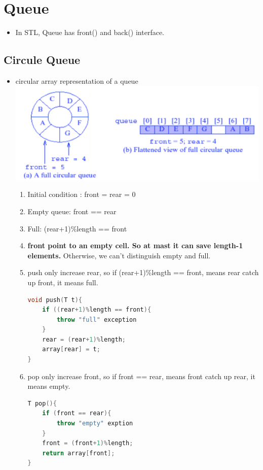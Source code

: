 \documentclass[a4paper,11pt,twoside]{book}
\begin{document}
\section{Queue}
\begin{itemize}
\item In STL, Queue has front() and back() interface. 

\end{itemize}


\subsection{Circule Queue}
\begin{itemize}
\item circular array representation of a queue
\includegraphics[scale=0.35]{pics/cd.png} \newline
\begin{enumerate}
\item Initial condition : front = rear = 0
\item Empty queue:     front == rear
\item Full: (rear+1)\%length == front
\item \textbf{front point to an empty cell. So at mast it can save length-1 elements. } Otherwise, we can't distinguish empty and full.

\item push only increase rear, so if (rear+1)\%length == front, means rear catch up front, it means full. 
\begin{lstlisting}[frame=single, language=c++]
void push(T t){
	if ((rear+1)%length == front){
		throw "full" exception
	}
	rear = (rear+1)%length;
	array[rear] = t;
}	
\end{lstlisting}

\item pop only increase front, so if front == rear, means front catch up rear, it means empty.
\begin{lstlisting}[frame=single, language=c++]
T pop(){
	if (front == rear){
		throw "empty" exption
	}
	front = (front+1)%length;
	return array[front];
}
\end{lstlisting}

\end{enumerate}

\end{itemize}
\end{document}
